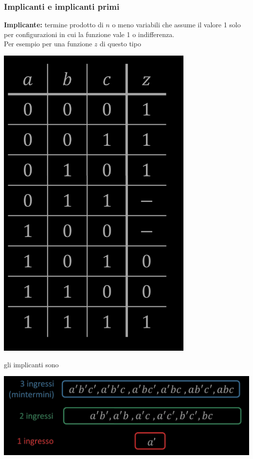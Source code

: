 \documentclass{article}
\begin{document}
\subsubsection{Implicanti e implicanti primi}
\textbf{Implicante:} termine prodotto di $n$ o meno variabili che assume il valore 1 solo per configurazioni in cui la funzione vale 1 o indifferenza.
\vspace{0.2cm}\\
Per esempio per una funzione $z$ di questo tipo
\begin{center}
    \includegraphics[scale=0.45]{zfun.png}
\end{center}
gli implicanti sono 
\begin{center}
    \includegraphics[scale=0.4]{impZ.png}
\end{center}
\end{document}
